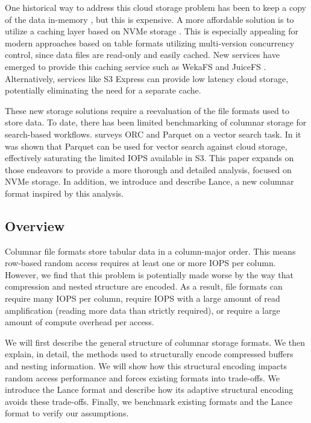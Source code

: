 \documentclass[sigconf, nonacm]{acmart}
\begin{document}
One historical way to address this cloud storage problem has been to keep a copy of the data in-memory \cite{PredicateCaching}, but this is expensive.  A more affordable solution is to utilize a caching layer based on NVMe storage \cite{NvmeCaching}.  This is especially appealing for modern approaches based on table formats utilizing multi-version concurrency control, since data files are read-only and easily cached.  New services have emerged to provide this caching service such as WekaFS \cite{WekaFs} and JuiceFS \cite{JuiceFs}.  Alternatively, services like S3 Express can provide low latency cloud storage, potentially eliminating the need for a separate cache.

These new storage solutions require a reevaluation of the file formats used to store data.  To date, there has been limited benchmarking of columnar storage for search-based workflows.  \cite{ColumnarEvaluation} surveys ORC and Parquet on a vector search task.  In \cite{Rottnest} it was shown that Parquet can be used for vector search against cloud storage, effectively saturating the limited IOPS available in S3.  This paper expands on those endeavors to provide a more thorough and detailed analysis, focused on NVMe storage.  In addition, we introduce and describe Lance, a new columnar format inspired by this analysis.

\subsection{Overview}

Columnar file formats store tabular data in a column-major order.  This means row-based random access requires at least one or more IOPS per column.  However, we find that this problem is potentially made worse by the way that compression and nested structure are encoded.  As a result, file formats can require many IOPS per column, require IOPS with a large amount of read amplification (reading more data than strictly required), or require a large amount of compute overhead per access.

We will first describe the general structure of columnar storage formats.  We then explain, in detail, the methods used to structurally encode compressed buffers and nesting information.  We will show how this structural encoding impacts random access performance and forces existing formats into trade-offs.  We introduce the Lance format and describe how its adaptive structural encoding avoids these trade-offs.  Finally, we benchmark existing formats and the Lance format to verify our assumptions.
\end{document}
